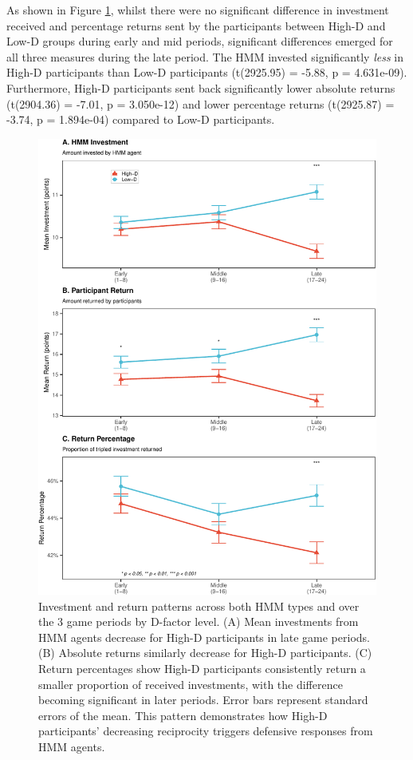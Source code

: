 \documentclass[
]{article}
\begin{document}
As shown in Figure \ref{fig:gamesPlot2}, whilst there were no significant difference in investment received and percentage returns sent by the participants between High-D and Low-D groups during early and mid periods, significant differences emerged for all three measures during the late period. The HMM invested significantly \emph{less} in High-D participants than Low-D participants (t(2925.95) = -5.88, p = 4.631e-09). Furthermore, High-D participants sent back significantly lower absolute returns (t(2904.36) = -7.01, p = 3.050e-12) and lower percentage returns (t(2925.87) = -3.74, p = 1.894e-04) compared to Low-D participants.

\begin{figure}
\includegraphics[width=0.9\linewidth]{article_files/figure-latex/gamesPlot2-1} \caption{Investment and return patterns across both HMM types and over the 3 game periods by D-factor level. (A) Mean investments from HMM agents decrease for High-D participants in late game periods. (B) Absolute returns similarly decrease for High-D participants. (C) Return percentages show High-D participants consistently return a smaller proportion of received investments, with the difference becoming significant in later periods. Error bars represent standard errors of the mean. This pattern demonstrates how High-D participants' decreasing reciprocity triggers defensive responses from HMM agents.}\label{fig:gamesPlot2}
\end{figure}
\end{document}
